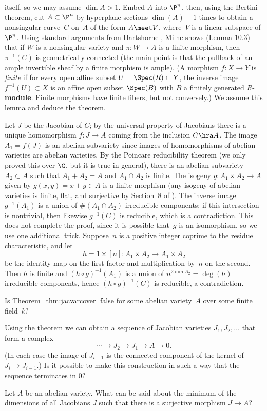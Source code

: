 \documentclass{report}
\begin{document}
itself, so we may assume $\dim A>1$. Embed $A$ into $\P^n$, then,
using the Bertini theorem, cut $A\subset \P^n$ by hyperplane
sections $\dim(A)-1$ times to obtain a nonsingular curve~$C$
on~$A$ of the form $A\meet V$, where~$V$ is a linear subspace of
$\P^n$.  Using standard arguments from Hartshorne
\cite{hartshorne}, Milne shows (Lemma 10.3) that if $W$ is a
nonsingular variety and $\pi:W\to A$ is a finite morphism, then
$\pi^{-1}(C)$ is geometrically connected (the main point is that
the pullback of an ample invertible sheaf by a finite morphism is
ample).  (A morphism $f:X\to Y$ is {\em finite} if for every open
affine subset $U=\Spec(R)\subset Y$, the inverse image
$f^{-1}(U)\subset X$ is an affine open subset $\Spec(B)$ with $B$
a finitely generated $R$-{\bf module}.  Finite morphisms have
finite fibers, but not conversely.) We assume this lemma and
deduce the theorem.

Let $J$ be the Jacobian of $C$; by the universal property of
Jacobians there is a unique homomorphism $f:J\to A$ coming from
the inclusion $C\hra A$.  The image $A_1=f(J)$ is an abelian
subvariety since images of homomorphisms of abelian varieties are
abelian varieties.  By the Poincare reducibility theorem (we only
proved this over $\C$, but it is true in general), there is an
abelian subvariety $A_2\subset A$ such that $A_1+A_2=A$ and
$A_1\cap A_2$ is finite. The isogeny $g:A_1\times A_2\to A$ given
by $g(x,y)=x+y\in A$ is a finite morphism (any isogeny of abelian
varieties is finite, flat, and surjective by Section~8 of
\cite{milne:abvars}). The inverse image $g^{-1}(A_1)$ is a union
of $\#(A_1\cap A_2)$ irreducible components; if this intersection
is nontrivial, then likewise $g^{-1}(C)$ is reducible, which is a
contradiction. This does not complete the proof, since it is
possible that~$g$ is an isomorphism, so we use one additional
trick. Suppose~$n$ is a positive integer coprime to the residue
characteristic, and let
$$h=1\times [n]:A_1\times A_2\to A_1\times A_2$$ be the identity
map on the first factor and multiplication by~$n$ on the second.
Then $h$ is finite and $(h\circ g)^{-1}(A_1)$ is a union of
$n^{2\dim A_2}=\deg(h)$ irreducible components, hence $(h\circ
g)^{-1}(C)$ is reducible, a contradiction.

\begin{question}
Is Theorem~\ref{thm:jacvarcover} false for some abelian
variety~$A$ over some finite field~$k$?
\end{question}
\begin{question}[Milne]
Using the theorem we can obtain a sequence of Jacobian varieties
$J_1, J_2, \ldots$ that form a complex
\[
  \cdots \to J_2 \to J_1 \to A \to 0.
\]
(In each case the image of $J_{i+1}$ is the connected component of
the kernel of $J_i\to J_{i-1}$.) Is it possible to make this
construction in such a way that the sequence terminates in $0$?
\end{question}
\begin{question}[Yau]
Let $A$ be an abelian variety.  What can be said about the minimum
of the dimensions of all Jacobians $J$ such that there is a
surjective morphism $J\to A$?
\end{question}
\end{document}
